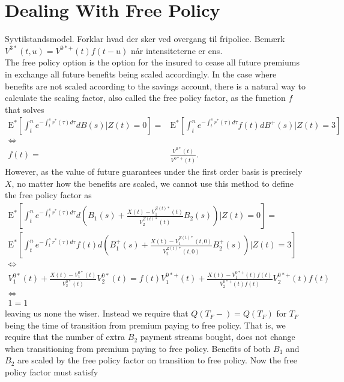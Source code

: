 \documentclass[12pt]{article}
\newcommand{\E}{\text{E}}
\theoremstyle{my_thm}
\begin{document}
\newpage

\iffalse



\section{Dealing With Free Policy}
Syvtilstandsmodel. Forklar hvad der sker ved overgang til fripolice. Bemærk $V^{3*}(t,u)=V^{0*+}(t)f(t-u)$ når intensiteterne er ens.\\

The free policy option is the option for the insured to cease all future premiums in exchange all future benefits being scaled accordingly. In the case where benefits are not scaled according to the savings account, there is a natural way to calculate the scaling factor, also called the free policy factor, as the function $f$ that solves
\begin{align*}
\E^* \left[ \int_t^n e^{-\int_t^s r^*(\tau) d\tau} dB(s)|Z(t)=0 \right]
=&\E^* \left[ \int_t^n e^{-\int_t^s r^*(\tau) d\tau} f(t) dB^+(s)|Z(t)=3 \right]
\\
\Leftrightarrow&
\\
f(t)=&\frac{V^{0*}(t)}{V^{0*+}(t)}.
\end{align*}
However, as the value of future guarantees under the first order basis is precisely $X$, no matter how the benefits are scaled, we cannot use this method to define the free policy factor as
\begin{gather*}
\E^* \left[ \int_t^n e^{-\int_t^s r^*(\tau) d\tau} d \left( B_1(s)+\frac{X(t)-V_1^{Z(t)*}(t)}{V_2^{Z(t)*}(t)}B_2(s) \right) |Z(t)=0 \right]
=
\\
\E^* \left[ \int_t^n e^{-\int_t^s r^*(\tau) d\tau} f(t) d \left( B_1^+(s)+\frac{X(t)-V_1^{Z(t)*}(t,0)}{V_2^{Z(t)*}(t,0)}B_2^+(s) \right) |Z(t)=3 \right]
\\
\Leftrightarrow
\\
V_1^{0*}(t)+ \frac{X(t)-V_1^{0*}(t)}{V_2^{0*}(t)}V_2^{0*}(t)
=
f(t)V_1^{0*+}(t)+ \frac{X(t)-V_1^{0*+}(t)f(t)}{V_2^{0*+}(t)f(t)}V_2^{0*+}(t)f(t)
\\
 \Leftrightarrow
\\
1=1
\end{gather*}
leaving us none the wiser. Instead we require that $Q(T_F-)=Q(T_F)$ for $T_F$ being the time of transition from premium paying to free policy. That is, we require that the number of extra $B_2$ payment streams bought, does not change when transitioning from premium paying to free policy. Benefits of both $B_1$ and $B_2$ are scaled by the free policy factor on transition to free policy. Now the free policy factor must satisfy
\end{document}
